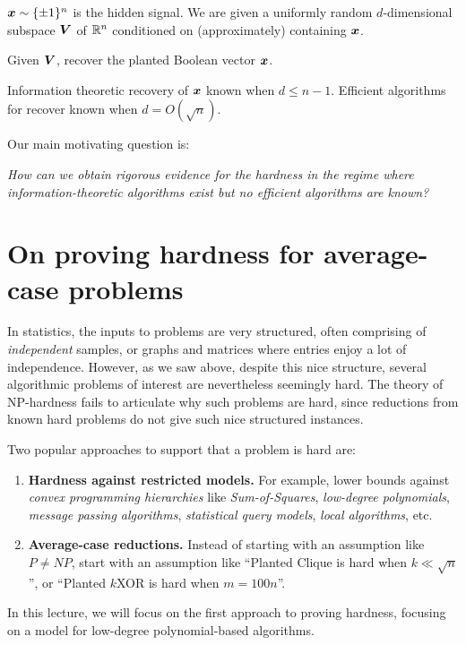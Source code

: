 \documentclass[11pt, letterpaper]{article}
\begin{document}
\medskip
\begin{tcolorbox}[arc=3mm,colback=White,coltext=Black,boxrule=1pt]

${\boldsymbol{x}}\sim\{\pm1\}^n$ is the hidden signal.
We are given a uniformly random $d$-dimensional subspace $\boldsymbol{V}$ of $\mathbb R^n$ conditioned on (approximately) containing ${\boldsymbol{x}}$.

Given $\boldsymbol{V}$, recover the planted Boolean vector ${\boldsymbol{x}}$.

Information theoretic recovery of ${\boldsymbol{x}}$ known when $d \le n-1$.
Efficient algorithms for recover known when $d = O(\sqrt{n})$.

\end{tcolorbox}

\noindent Our main motivating question is:
\begin{question}
    \emph{How can we obtain rigorous evidence for the hardness in the regime where information-theoretic algorithms exist but no efficient algorithms are known?}
\end{question}

\section{On proving hardness for average-case problems}
In statistics, the inputs to problems are very structured, often comprising of \emph{independent} samples, or graphs and matrices where entries enjoy a lot of independence.
However, as we saw above, despite this nice structure, several algorithmic problems of interest are nevertheless seemingly hard.
The theory of NP-hardness fails to articulate why such problems are hard, since reductions from known hard problems do not give such nice structured instances.

Two popular approaches to support that a problem is hard are:
\begin{enumerate}
    \item {\bf Hardness against restricted models.}
    For example, lower bounds against \emph{convex programming hierarchies} like \emph{Sum-of-Squares}, \emph{low-degree polynomials}, \emph{message passing algorithms}, \emph{statistical query models}, \emph{local algorithms}, etc.
    \item {\bf Average-case reductions.}
    Instead of starting with an assumption like $P\ne NP$, start with an assumption like ``Planted Clique is hard when $k \ll \sqrt{n}$'', or ``Planted $k$XOR is hard when $m = 100 n$''.
\end{enumerate}
In this lecture, we will focus on the first approach to proving hardness, focusing on a model for low-degree polynomial-based algorithms.
\end{document}
